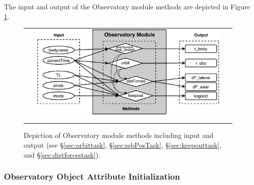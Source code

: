 \documentclass[cleanfoot]{asme2ej}
\newcommand{\reffig}[1]{Figure \ref{#1}}
\begin{document}
The input and output of the Observatory module methods are depicted in \reffig{fig:observatorymodule}.

\begin{figure}[ht]
    \begin{center}
        \begin{tabular}{c}
             \includegraphics[width=0.9\textwidth]{observatory4}
        \end{tabular}
    \end{center}
    \caption{\label{fig:observatorymodule} Depiction of Observatory module methods including input and output (see \S\ref{sec:orbittask}, \S\ref{sec:ssbPosTask}, \S\ref{sec:keepouttask}, and \S\ref{sec:distforcestask}).}
\end{figure}

\label{sec:observatory}
\subsubsection{Observatory Object Attribute Initialization}
\end{document}
